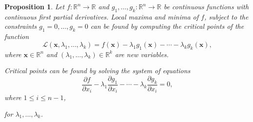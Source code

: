 \documentclass[
]{book}
\newtheorem{proposition}{Proposition}[chapter]
\theoremstyle{definition}
\theoremstyle{definition}
\theoremstyle{definition}
\theoremstyle{definition}
\theoremstyle{remark}
\begin{document}
\begin{proposition}
\protect\hypertarget{prp:lagrange-multipliers}{}\label{prp:lagrange-multipliers}Let \(f : \mathbb{R}^n \to \mathbb{R}\) and \(g_1,\ldots,g_k : \mathbb{R}^n \to \mathbb{R}\) be continuous functions with continuous first partial derivatives.
Local maxima and minima of \(f\), subject to the constraints \(g_1=0,\ldots,g_k=0\) can be found by computing the critical points of the function
\[
\mathcal{L}(\mathbf{x}, \lambda_1,\ldots,\lambda_k) = f(\mathbf{x}) - \lambda_1 g_1(\mathbf{x}) - \cdots - \lambda_k g_k(\mathbf{x}),
\]
where \(\mathbf{x} \in \mathbb{R}^n\) and \((\lambda_1,\ldots,\lambda_k) \in \mathbb{R}^k\) are new variables.

Critical points can be found by solving the system of equations
\begin{equation}
\dfrac{\partial f}{\partial x_i} - \lambda_1 \dfrac{\partial g_1}{\partial x_i} - \cdots - \lambda_k \dfrac{\partial g_k}{\partial x_i}= 0,
\label{eq:lagrange}
\end{equation}
where \(1\le i \le n-1\),

for \(\lambda_1,\ldots,\lambda_k\).
\end{proposition}
\end{document}
